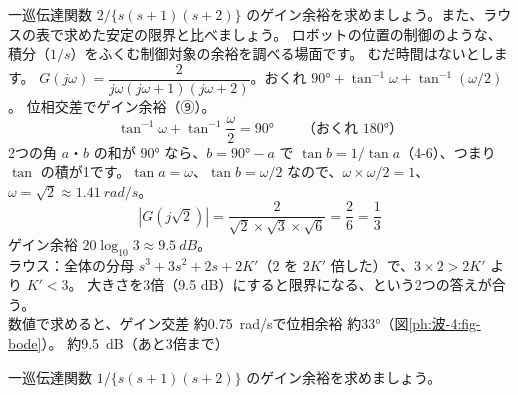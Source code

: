 \label{ph:波-4:ex10}
\begin{phreidai}[ゲイン余裕と位相余裕]
一巡伝達関数 $2/\{s(s+1)(s+2)\}$ のゲイン余裕を求めましょう。また、ラウスの表で求めた安定の限界と比べましょう。
\phbamen
ロボットの位置の制御のような、積分（$1/s$）をふくむ制御対象の余裕を調べる場面です。
\phmushi
むだ時間はないとします。
\phzu
$G(j\omega)=\dfrac{2}{j\omega(j\omega+1)(j\omega+2)}$。おくれ $90°+\tan^{-1}\omega+\tan^{-1}(\omega/2)$。
\phriyu
位相交差でゲイン余裕（⑨）。
\phtateru
\[\tan^{-1}\omega+\tan^{-1}\frac{\omega}{2}=90°\qquad\text{（おくれ $180°$）}\]
\phtoku
2つの角 $a$・$b$ の和が $90°$ なら、$b=90°-a$ で $\tan b=1/\tan a$（4-6）、つまり $\tan$ の積が1です。$\tan a=\omega$、$\tan b=\omega/2$ なので、$\omega\times\omega/2=1$、$\omega=\sqrt2\approx\qty{1.41}{rad/s}$。
\[|G(j\sqrt2)|=\frac{2}{\sqrt2\times\sqrt3\times\sqrt6}=\frac{2}{6}=\frac13\]
ゲイン余裕 $20\log_{10}3\approx\qty{9.5}{dB}$。\\
ラウス：全体の分母 $s^3+3s^2+2s+2K'$（$2$ を $2K'$ 倍した）で、$3\times2>2K'$ より $K'<3$。
\phtashikame
大きさを3倍（9.5 dB）にすると限界になる、という2つの答えが合う。\\
数値で求めると、ゲイン交差 約\qty{0.75}{rad/s}で位相余裕 約33°（図\ref{ph:波-4:fig-bode}）。
\kotae 約\qty{9.5}{dB}（あと3倍まで）
\end{phreidai}
\begin{jibun}
一巡伝達関数 $1/\{s(s+1)(s+2)\}$ のゲイン余裕を求めましょう。
\end{jibun}

